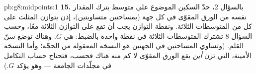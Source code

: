 \begin{solution}{pb:g8:midpoints:1}
\textbf{15.} بالسؤال 2، حدّ السكين الموضوع على متوسط يترك
المقدار نفسه من الورق المقوّى في كل جهة (بمساحتين متساويتين)، إذن
يتوازن المثلث على كل من  المتوسطات الثلاثة. ونقطة
التوازن يجب أن تقع على  التوازن الثلاثة معًا، وحسب
السؤال 8 تشترك المتوسطات الثلاثة في نقطة واحدة بالضبط: هي $G$. وهناك
توضع سنّ القلم. (وتساوي المساحتين في الجهتين هو
النسخة المعقولة من الحجّة؛ وأما النسخة الأمينة، التي تزن
\emph{أين} يقع الورق المقوّى لا كم منه هناك فحسب،
فتحتاج حساب التكامل في مجلّدات الجامعة --- وهو
يؤكد $G$.)
\end{solution}
